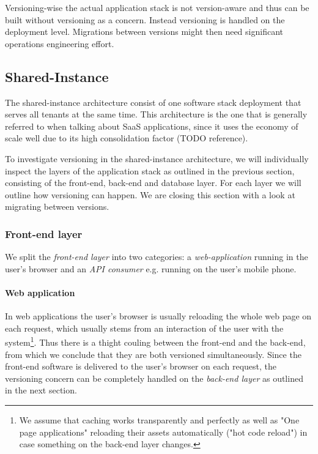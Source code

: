 Versioning-wise the actual application stack is not version-aware and thus can be built without versioning as a concern. Instead versioning is handled on the deployment level. Migrations between versions might then need significant operations engineering effort.

\subsection{Shared-Instance}

The shared-instance architecture consist of one software stack deployment that serves all tenants at the same time. This architecture is the one that is generally referred to when talking about SaaS applications, since it uses the economy of scale well due to its high consolidation factor (TODO reference).

To investigate versioning in the shared-instance architecture, we will individually inspect the layers of the application stack as outlined in the previous section, consisting of the front-end, back-end and database layer. For each layer we will outline how versioning can happen. We are closing this section with a look at migrating between versions.

\subsubsection{Front-end layer}
\label{sec:sharedfrontend}

We split the \emph{front-end layer} into two categories: a \emph{web-application} running in the user's browser and an \emph{API consumer} e.g. running on the user's mobile phone.

\paragraph{Web application} In web applications the user's browser is usually reloading the whole web page on each request, which usually stems from an interaction of the user with the system\footnote{We assume that caching works transparently and perfectly as well as "One page applications" reloading their assets automatically ("hot code reload") in case something on the back-end layer changes.}. Thus there is a thight couling between the front-end and the back-end, from which we conclude that they are both versioned simultaneously. Since the front-end software is delivered to the user's browser on each request, the versioning concern can be completely handled on the \emph{back-end layer} as outlined in the next section.

